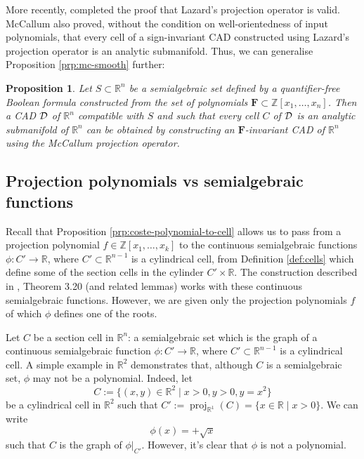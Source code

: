 \documentclass[
]{book}
\newtheorem{proposition}{Proposition}[chapter]
\theoremstyle{definition}
\theoremstyle{definition}
\theoremstyle{definition}
\theoremstyle{definition}
\theoremstyle{remark}
\begin{document}
More recently, \citet{mccallum2019} completed the proof that Lazard's projection operator is valid. McCallum also proved, without the condition on well-orientedness of input polynomials, that every cell of a sign-invariant CAD constructed using Lazard's projection operator is an analytic submanifold. Thus, we can generalise Proposition \ref{prp:mc-smooth} further:

\begin{proposition}
\protect\hypertarget{prp:lz-smooth}{}\label{prp:lz-smooth}Let \(S \subset \mathbb{R}^n\) be a semialgebraic set defined by a quantifier-free Boolean formula constructed from the set of polynomials \(\mathbf{F} \subset \mathbb{Z}[x_1,\ldots,x_n]\).
Then a CAD \(\cal D\) of \(\mathbb{R}^n\) compatible with \(S\) and such that every cell \(C\) of \(\cal D\) is an analytic submanifold of \(\mathbb{R}^n\) can be obtained by constructing an \(\mathbf{F}\)-invariant CAD of \(\mathbb{R}^n\) using the McCallum projection operator.
\end{proposition}

\hypertarget{projection-polynomials-vs-semialgebraic-functions}{%
\subsection{Projection polynomials vs semialgebraic functions}\label{projection-polynomials-vs-semialgebraic-functions}}

Recall that Proposition \ref{prp:coste-polynomial-to-cell} allows us to pass from a projection polynomial \(f \in \mathbb{Z}[x_1,\ldots,x_k]\) to the continuous semialgebraic functions \(\phi : C' \to \mathbb{R}\), where \(C' \subset \mathbb{R}^{n-1}\) is a cylindrical cell, from Definition \ref{def:cells} which define some of the section cells in the cylinder \(C' \times \mathbb{R}\). The construction described in \citet{bgv15}, Theorem 3.20 (and related lemmas) works with these continuous semialgebraic functions. However, we are given only the projection polynomials \(f\) of which \(\phi\) defines one of the roots.

Let \(C\) be a section cell in \(\mathbb{R}^n\): a semialgebraic set which is the graph of a continuous semialgebraic function \(\phi : C' \to \mathbb{R}\), where \(C' \subset \mathbb{R}^{n-1}\) is a cylindrical cell. A simple example in \(\mathbb{R}^2\) demonstrates that, although \(C\) is a semialgebraic set, \(\phi\) may not be a polynomial. Indeed, let
\[ C := \{ (x,y) \in \mathbb{R}^2 \mid x > 0, y > 0, y = x^2 \} \]
be a cylindrical cell in \(\mathbb{R}^2\) such that \(C' := {\operatorname{proj}_{\mathbb{R}^{1}}}(C) = \{ x \in \mathbb{R}\mid x > 0 \}\). We can write
\[
\phi(x) = +\sqrt{x}
\]
such that \(C\) is the graph of \(\phi\vert_{C'}\). However, it's clear that \(\phi\) is not a polynomial.
\end{document}
